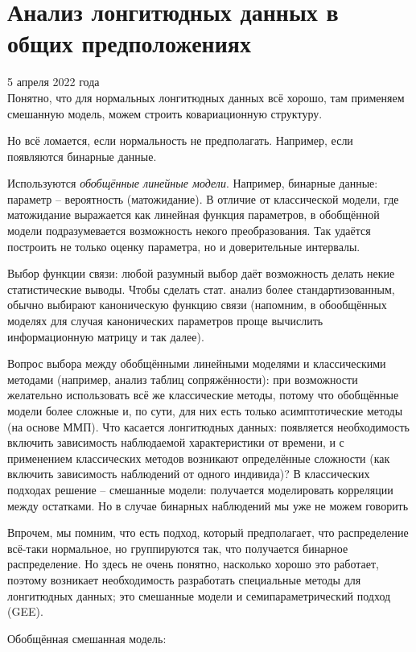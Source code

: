 \documentclass[main.tex]{subfiles}
\begin{document}
\section{Анализ лонгитюдных данных в общих предположениях}
5 апреля 2022 года \\

Понятно, что для нормальных лонгитюдных данных всё хорошо, там применяем смешанную модель, можем строить ковариационную структуру.

Но всё ломается, если нормальность не предполагать.
Например, если появляются бинарные данные.

Используются \emph{обобщённые линейные модели}.
Например, бинарные данные: параметр -- вероятность (матожидание).
В отличие от классической модели, где матожидание выражается как линейная функция параметров, в обобщённой модели подразумевается возможность некого преобразования.
Так удаётся построить не только оценку параметра, но и доверительные интервалы.

Выбор функции связи: любой разумный выбор даёт возможность делать некие статистические выводы.
Чтобы сделать стат. анализ более стандартизованным, обычно выбирают каноническую функцию связи (напомним, в обообщённых моделях для случая канонических параметров проще вычислить информационную матрицу и так далее).

Вопрос выбора между обобщёнными линейными моделями и классическими методами (например, анализ таблиц сопряжённости): при возможности желательно использовать всё же классические методы, потому что обобщённые модели более сложные и, по сути, для них есть только асимптотические методы (на основе ММП).
Что касается лонгитюдных данных: появляется необходимость включить зависимость наблюдаемой характеристики от времени, и с применением классических методов возникают определённые сложности (как включить зависимость наблюдений от одного индивида)?
В классических подходах решение -- смешанные модели: получается моделировать корреляции между остатками.
Но в случае бинарных наблюдений мы уже не можем говорить

Впрочем, мы помним, что есть подход, который предполагает, что распределение всё-таки нормальное, но группируются так, что получается бинарное распределение.
Но здесь не очень понятно, насколько хорошо это работает, поэтому возникает необходимость разработать специальные методы для лонгитюдных данных; это смешанные модели и семипараметрический подход (GEE).

Обобщённая смешанная модель:
\end{document}
